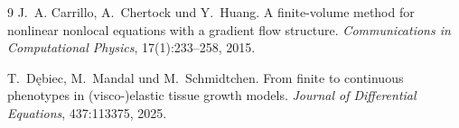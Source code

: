 \documentclass[11pt]{article}
\begin{document}
\begin{thebibliography}{9}
J.~A. Carrillo, A.~Chertock und Y.~Huang.
\newblock A finite-volume method for nonlinear nonlocal equations with a gradient
flow structure.
\newblock \emph{Communications in Computational Physics}, 17(1):233--258, 2015.

T.~Dębiec, M.~Mandal und M.~Schmidtchen.
\newblock From finite to continuous phenotypes in (visco-)elastic tissue growth
models.
\newblock \emph{Journal of Differential Equations}, 437:113375, 2025.
\end{thebibliography}
\end{document}
